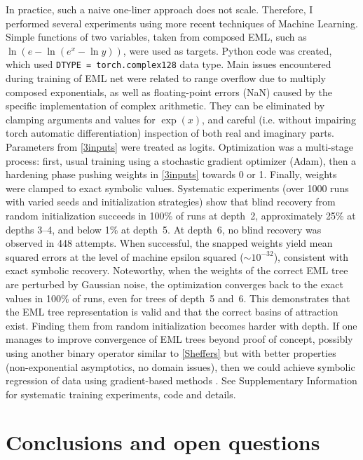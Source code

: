 \documentclass[12pt]{article}
\begin{document}
In practice, such a naive one-liner approach does not scale. Therefore, I performed several experiments using more recent techniques of Machine Learning. Simple functions of two variables, taken from composed EML, such as $\ln(e-\ln(e^x - \ln{y}))$, were used as targets.  Python code was created, which used \texttt{DTYPE = torch.complex128} data type. Main issues encountered during training of EML net were related to range overflow due to multiply composed exponentials, as well as floating-point errors (NaN) caused by the specific implementation of complex arithmetic. They can be eliminated by clamping arguments and values for $\exp{(x)}$, and careful (i.e. without impairing torch automatic differentiation) inspection of both real and imaginary parts. Parameters from  \eqref{3inputs} were treated as logits. Optimization was a multi-stage process: first, usual training using a stochastic gradient optimizer (Adam), then a hardening phase pushing weights in \eqref{3inputs} towards 0 or 1. Finally, weights were clamped to exact symbolic values. Systematic experiments (over 1000 runs with varied seeds and initialization strategies) show that blind recovery from random initialization succeeds in 100\% of runs at depth~2, approximately 25\% at depths 3--4, and below 1\% at depth~5. At depth~6, no blind recovery was observed in 448 attempts. When successful, the snapped weights yield mean squared errors at the level of machine epsilon squared ($\sim 10^{-32}$), consistent with exact symbolic recovery. Noteworthy, when the weights of the correct EML tree are perturbed by Gaussian noise, the optimization converges back to the exact values in 100\% of runs, even for trees of depth~5 and~6. This demonstrates that the EML tree representation is valid and that the correct basins of attraction exist. Finding them from random initialization becomes harder with depth. If one manages to improve convergence of EML trees beyond proof of concept, possibly using another binary operator similar to \eqref{Sheffers} but with better properties (non-exponential asymptotics, no domain issues), then we could achieve symbolic regression of data using gradient-based methods \cite{petersen2021deep}. See Supplementary Information for systematic training experiments, code and details.



\section{Conclusions and open questions \label{sec:conclusions}}
\end{document}
